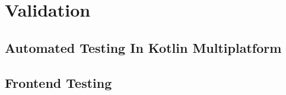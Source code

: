 \chapter{Validation}
\label{chap:validation}
\section{Automated Testing In Kotlin Multiplatform}
\label{sec:automated-testing-in-kotlin-multiplatform}
\section{Frontend Testing}
\label{sec:frontend-testing}
